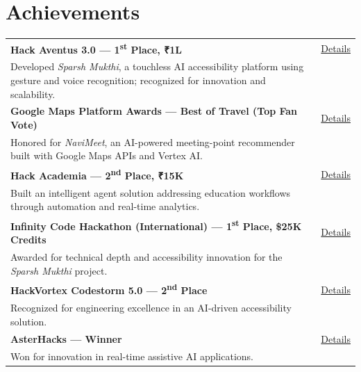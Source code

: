 \documentclass[a4paper,12pt]{article}
\begin{document}


\section{Achievements}

\begin{tabularx}{\linewidth}{@{}X r@{}}

\textbf{Hack Aventus 3.0 — 1\textsuperscript{st} Place, ₹1L} & \href{https://devfolio.co/projects/sparsh-mukthi-5a19}{Details} \\
Developed \textit{Sparsh Mukthi}, a touchless AI accessibility platform using gesture and voice recognition; recognized for innovation and scalability. & \\[6pt]

\textbf{Google Maps Platform Awards — Best of Travel (Top Fan Vote)} & \href{https://mapsplatform.google.com/awards/?nominee=navi-meet}{Details} \\
Honored for \textit{NaviMeet}, an AI-powered meeting-point recommender built with Google Maps APIs and Vertex AI. & \\[6pt]

\textbf{Hack Academia — 2\textsuperscript{nd} Place, ₹15K} & \href{https://www.linkedin.com/posts/vigneshbs-dev_hackademia-hackwithindia-hackathon-activity-7366155378897661952-HsNE}{Details} \\
Built an intelligent agent solution addressing education workflows through automation and real-time analytics. & \\[6pt]

\textbf{Infinity Code Hackathon (International) — 1\textsuperscript{st} Place, \$25K Credits} & \href{https://devpost.com/software/sparsh-mukthi-t6qlkr}{Details} \\
Awarded for technical depth and accessibility innovation for the \textit{Sparsh Mukthi} project. & \\[6pt]

\textbf{HackVortex Codestorm 5.0 — 2\textsuperscript{nd} Place} & \href{https://devpost.com/software/sparsh-mukthi-t6qlkr}{Details} \\
Recognized for engineering excellence in an AI-driven accessibility solution. & \\[6pt]

\textbf{AsterHacks — Winner} & \href{https://devpost.com/software/sparsh-mukthi-t6qlkr}{Details} \\
Won for innovation in real-time assistive AI applications. & \\[6pt]


\end{tabularx}
\end{document}

